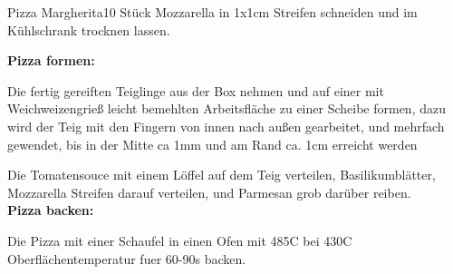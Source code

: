 \documentclass[a4paper,10pt]{article}
\newcommand{\recipeStep}[1]{\newstep\noindent\textbf{#1:}}
\begin{document}
\begin{recipe}{Pizza Margherita}{10 Stück}
    Mozzarella in 1x1cm Streifen schneiden und im Kühlschrank trocknen lassen.

    \recipeStep{Pizza formen}

    Die fertig gereiften Teiglinge aus der Box nehmen und auf einer mit Weichweizengrieß leicht bemehlten Arbeitsfläche zu einer Scheibe formen,
    dazu wird der Teig mit den Fingern von innen nach außen gearbeitet, und mehrfach gewendet, bis in der Mitte ca 1mm und am Rand ca. 1cm erreicht werden


    \newstep

    Die Tomatensouce mit einem Löffel auf dem Teig verteilen, Basilikumblätter, Mozzarella Streifen darauf verteilen, und Parmesan grob darüber reiben.
    \\
    \recipeStep{Pizza backen}

    Die Pizza mit einer Schaufel in einen Ofen mit 485\0C bei 430\0C Oberflächentemperatur fuer 60-90s backen.



    \end{recipe}
\end{document}
